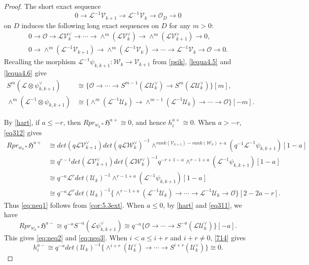 \documentclass{amsart}
\numberwithin{equation}{section}
\newcommand\mc{\mathcal}
\newcommand\mf{\mathfrak}
\theoremstyle{definition}
\theoremstyle{remark}
\begin{document}
\begin{proof}
The short exact sequence
  $$0\to \mc{L}^{-1}\mc{V}_{k+1}\to \mc{L}^{-1}\mc{V}_{k}\to \mc{O}_{D}\to 0$$
  on $D$ induces the following long exact sequences on $D$ for any $m>0$:
\begin{align}
  \label{lequa4.5}  0 \to \mc{O} \to \mc{L}\mc{V}_{k}^{\vee} \to \cdots \to \wedge^{m}(\mc{L}\mc{V}_{k}^{\vee})\to \wedge^{m}(\mc{L}\mc{V}_{k+1}^{\vee})\to 0,\\
 \label{lequa4.6} 0\to \wedge^{m}(\mc{L}^{-1}\mc{V}_{k+1})\to \wedge^{m}(\mc{L}^{-1}\mc{V}_{k})\to \cdots \to \mc{L}^{-1}\mc{V}_{k}\to \mc{O}\to 0. 
\end{align}
Recalling the morphism $\mc{L}^{-1}\psi_{k,k+1}:\mc{W}_{k}\to \mc{V}_{k+1}$ from \cref{psik}, \cref{lequa4.5} and \cref{lequa4.6} give
\begin{align}
    \label{eq311}
  S^{m}(\mc{L}\otimes \psi_{k,k+1}^{\vee})&\cong \{\mc{O}\to \cdots \to S^{m-1}(\mc{L}\mc{U}_{k}^{\vee})\to S^{m}(\mc{L}\mc{U}_{k}^{\vee})\}[m],\\
  \label{eq312}
  \wedge^{m}(\mc{L}^{-1}\otimes \psi_{k,k+1})&\cong \{\wedge^{m}(\mc{L}^{-1}\mc{U}_{k})\to \wedge^{m-1}(\mc{L}^{-1}\mc{U}_{k})\to \cdots \to \mc{O}\}[-m].
\end{align}

By \cref{hart}, if $a\leq -r$, then $Rpr_{w_{k}*}\mf{H}^{a+}\cong0$, and hence $h_{i}^{a+}\cong0$. When $a> -r$, \cref{eq312} gives
\begin{align*}
  Rpr_{w_{k}*}\mf{H}^{a+}
                         &\cong det(q\mc{L}\mc{V}_{k+1}^{\vee})det(q\mc{L}\mc{W}_{k}^{\vee})^{-1}\wedge^{rank(\mc{V}_{k+1})-rank(\mc{W}_{k})+a}(q^{-1}\mc{L}^{-1}\psi_{k,k+1})[1-a] \\
                         &\cong q^{r-1}det(\mc{L}\mc{V}_{k+1}^{\vee})det(\mc{L}\mc{W}_{k}^{\vee})^{-1}q^{-r+1-a}\wedge^{r-1+a}(\mc{L}^{-1}\psi_{k,k+1})[1-a] \\
                         &\cong q^{-a}\mc{L}^{r}det(\mc{U}_{k})^{-1}\wedge^{r-1+a}(\mc{L}^{-1}\psi_{k,k+1})[1-a] \\
                       &\cong q^{-a}\mc{L}^{r}det(\mc{U}_{k})^{-1}\{\wedge^{r-1+a}(\mc{L}^{-1}\mc{U}_{k})\to \cdots \to \mc{L}^{-1}\mc{U}_{k}\to \mc{O}\}[2-2a-r]. 
\end{align*}
Thus \cref{eq:neq1} follows from \cref{cor:5.3ext}. When $a\leq 0$, by \cref{hart} and \cref{eq311}, we have
\begin{equation}
  \label{714}
  Rpr_{w_{k}*}\mf{H}^{a-}\cong q^{-a}S^{-a}(\mc{L}\psi_{k,k+1}^{\vee})\cong q^{-a}\{\mc{O}\to \cdots \to S^{-a}(\mc{L}\mc{U}_{k}^{\vee})\}[-a].
\end{equation}
This gives \cref{eq:neq2} and \cref{eq:neq3}. When $i<a\leq i+r$ and $i+r\neq 0$, \cref{714} gives
$$h_{i}^{a-}\cong q^{-a}det(\mc{U}_{k})^{-1}\{\wedge^{i+r}(\mc{U}_{k}^{\vee})\to \cdots \to S^{i+r}(\mc{U}_{k}^{\vee})\}\cong0.$$


\end{proof}
\end{document}
